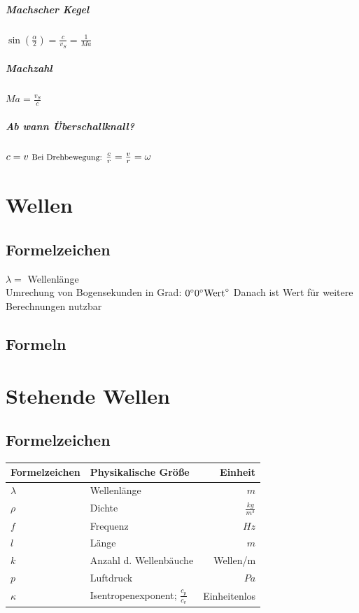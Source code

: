 \documentclass[12pt, a4paper]{scrreprt}
\begin{document}
\vspace*{1cm}
\paragraph{Machscher Kegel} \dotfill \(\sin \left( \frac{\alpha}{2} \right) = \frac{c}{v_S} = \frac{1}{Ma}\)
\paragraph{Machzahl} \dotfill \(Ma = \frac{v_S}{c}\)
\paragraph{Ab wann Überschallknall?} \dotfill \(c = v \text{ \footnotesize Bei Drehbewegung: }\frac{c}{r} = \frac{v}{r} = \omega\)





\chapter{Wellen}

\section{Formelzeichen}
\(\lambda=\) \dotfill Wellenlänge\\
Umrechung von Bogensekunden in Grad: \dotfill \(0 \degree 0\degree \text{Wert}\degree\) Danach ist Wert für weitere Berechnungen nutzbar

\section{Formeln}

\chapter{Stehende Wellen}

\section{Formelzeichen}

\begin{center}
  \makegapedcells{}
  \begin{tabular}{l | l | r}
    Formelzeichen & Physikalische Größe & Einheit\\\hline \hline
    \(\lambda\) & Wellenlänge & \(m\)\\ \hline
    \(\rho\) & Dichte & \(\frac{kg}{m^3}\)\\ \hline
    \(f\) & Frequenz & \(Hz\)\\ \hline
    \(l\) & Länge & \(m\)\\ \hline
    \(k\) & Anzahl d. Wellenbäuche & Wellen/m\\ \hline
    \(p\) & Luftdruck & \(Pa\)\\ \hline
    \(\kappa\) & Isentropenexponent; \(\frac{c_p}{c_v}\) & Einheitenlos\\ \hline
  \end{tabular}
\end{center}
\end{document}
